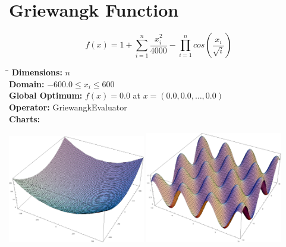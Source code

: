 \documentclass[12pt, a4paper]{article}
\begin{document}
	\section*{Griewangk Function}
		\begin{equation*}
			f(x) = 1 + \sum_{i=1}^n \frac{x_i^2}{4000} - \prod_{i=1}^n cos(\frac{x_i}{\sqrt i})
		\end{equation*}

		\begin{tabbing}
			\hspace{5cm}\=\kill
			\textbf{Dimensions:}     \> $n$ \\
			\textbf{Domain:}         \> $-600.0 \leq x_i \leq 600$ \\
			\textbf{Global Optimum:} \> $f(x) = 0.0$ at $x = (0.0, 0.0, \dots, 0.0)$ \\
			\textbf{Operator:}       \> GriewangkEvaluator \\
			\textbf{Charts:}         \> \\
		\end{tabbing}

		\begin{center}
			\includegraphics[width=0.45\textwidth]{Images/Griewangk_large}
			\hfill
			\includegraphics[width=0.45\textwidth]{Images/Griewangk_small}
		\end{center}
\end{document}
